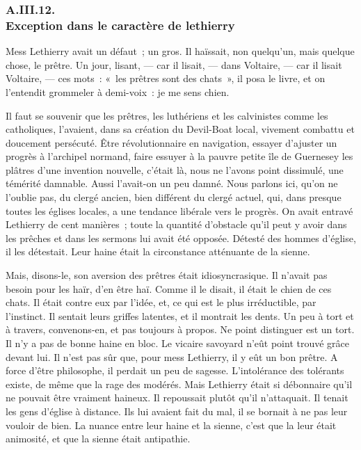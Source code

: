 \documentclass[french,twoside]{book} %
\begin{document}
 \subsubsection[{A.III.12. Exception dans le caractère de lethierry}]{A.III.12. \\
Exception dans le caractère de lethierry}
\noindent Mess Lethierry avait un défaut ; un gros. Il haïssait, non quelqu’un, mais quelque chose, le prêtre. Un jour, lisant, — car il lisait, — dans Voltaire, — car il lisait Voltaire, — ces mots : « les prêtres sont des chats », il posa le livre, et on l’entendit grommeler à demi-voix : je me sens chien.\par
Il faut se souvenir que les prêtres, les luthériens et les calvinistes comme les catholiques, l’avaient, dans sa création du Devil-Boat local, vivement combattu et doucement persécuté. Être révolutionnaire en navigation, essayer d’ajuster un progrès à l’archipel normand, faire essuyer à la pauvre petite île de Guernesey les plâtres d’une invention nouvelle, c’était là, nous ne l’avons point dissimulé, une témérité damnable. Aussi l’avait-on un peu damné. Nous parlons ici, qu’on ne l’oublie pas, du clergé ancien, bien différent du clergé actuel, qui, dans presque toutes les églises locales, a une tendance libérale vers le  progrès. On avait entravé Lethierry de cent manières ; toute la quantité d’obstacle qu’il peut y avoir dans les prêches et dans les sermons lui avait été opposée. Détesté des hommes d’église, il les détestait. Leur haine était la circonstance atténuante de la sienne.\par
Mais, disons-le, son aversion des prêtres était idiosyncrasique. Il n’avait pas besoin pour les haïr, d’en être haï. Comme il le disait, il était le chien de ces chats. Il était contre eux par l’idée, et, ce qui est le plus irréductible, par l’instinct. Il sentait leurs griffes latentes, et il montrait les dents. Un peu à tort et à travers, convenons-en, et pas toujours à propos. Ne point distinguer est un tort. Il n’y a pas de bonne haine en bloc. Le vicaire savoyard n’eût point trouvé grâce devant lui. Il n’est pas sûr que, pour mess Lethierry, il y eût un bon prêtre. A force d’être philosophe, il perdait un peu de sagesse. L’intolérance des tolérants existe, de même que la rage des modérés. Mais Lethierry était si débonnaire qu’il ne pouvait être vraiment haineux. Il repoussait plutôt qu’il n’attaquait. Il tenait les gens d’église à distance. Ils lui avaient fait du mal, il se bornait à ne pas leur vouloir de bien. La nuance entre leur haine et la sienne, c’est que la leur était animosité, et que la sienne était antipathie.\par
\end{document}
